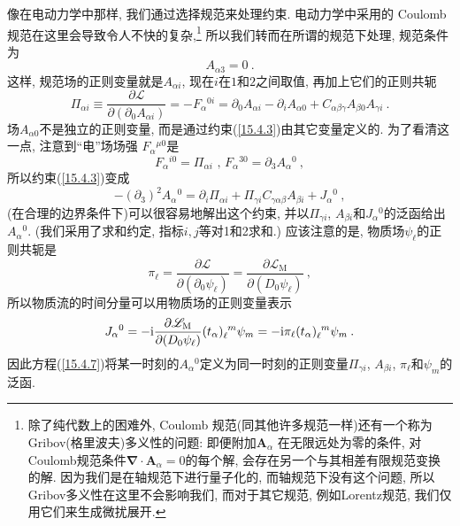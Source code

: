 像在电动力学中那样, 我们通过选择规范来处理约束. 电动力学中采用的 Coulomb 规范在这里会导致令人不快的复杂,\footnote{除了纯代数上的困难外, Coulomb 
规范(同其他许多规范一样)还有一个称为Gribov(格里波夫)多义性的问题:\cite{9} 即便附加$\bm{A}_{\alpha }$%
在无限远处为零的条件, 对Coulomb规范条件$\bm{\nabla}\cdot\bm{A}_{\alpha }=0$的每个解, 会存在另一个与其相差有限规范变换的解. 
因为我们是在轴规范下进行量子化的, 而轴规范下没有这个问题, 所以Gribov多义性在这里不会影响我们, 而对于其它规范, 例如Lorentz规范, 
我们仅用它们来生成微扰展开.} 所以我们转而在所谓的{}规范下处理, 规范条件为
\begin{equation}
A_{\alpha 3}=0\:.   \label{15.4.4}
\end{equation}
这样, 规范场的正则变量就是$A_{\alpha i}$, 现在$i$在$1$和$2$之间取值, 再加上它们的正则共轭\begin{equation}
\Pi _{\alpha i}\equiv \frac{\partial \mathscr{L}}{\partial (\partial
_{0}A_{\alpha i})}=-F_{\alpha }{}^{0i}=\partial _{0}A_{\alpha i}-\partial
_{i}A_{\alpha 0}+C_{\alpha \beta \gamma }A_{\beta 0}A_{\gamma i}\:. 
\label{15.4.5}
\end{equation}%
场$A_{\alpha 0}$不是独立的正则变量, 而是通过约束(\ref{15.4.3})由其它变量定义的. 为了看清这一点, 注意到``电''场场强%
$F_{\alpha }{}^{\mu 0}$是\begin{equation}
F_{\alpha }{}^{i0}=\Pi _{\alpha i}\text{ , \ \ \ \ \ \ \ \ }F_{\alpha
}{}^{30}=\partial _{3}A_{\alpha }{}^{0}\:,   \label{15.4.6}
\end{equation}%
所以约束(\ref{15.4.3})变成\begin{equation}
-(\partial _{3})^{2}A_{\alpha }{}^{0}=\partial _{i}\Pi _{\alpha i}+\Pi
_{\gamma i}C_{\gamma \alpha \beta }A_{\beta i}+J_{\alpha }{}^{0}\:, 
\label{15.4.7}
\end{equation}
(在合理的边界条件下)可以很容易地解出这个约束, 并以$\Pi _{\gamma i}$, $A_{\beta i}$和$J_{\alpha }{}^{0}$的泛函给出$A_{\alpha }{}^{0}$. 
(我们采用了求和约定, 指标$i,j$等对1和2求和.) 应该注意的是, 物质场$\psi _{\ell }$的正则共轭是%
\begin{equation}
\pi _{\ell }=\frac{\partial \mathscr{L}}{\partial (\partial _{0}\psi _{\ell
})}=\frac{\partial \mathscr{L}_{\mathrm{M}}}{\partial (D_{0}\psi _{\ell })}\:, 
\label{15.4.8}
\end{equation}%
所以物质流的时间分量可以{}用物质场的正则变量表示\begin{equation}
J_{\alpha }{}^{0}=-\mathrm{i}\frac{\partial \mathscr{L}_{\mathrm{M}}}{\partial (D_{0}\psi
_{\ell })}(t_{\alpha })_{\ell}^{\phantom{\ell}m}\psi _{m}=-\mathrm{i} \pi _{\ell
}(t_{\alpha })_{\ell}^{\phantom{\ell}m}\psi _{m}\:.   \label{15.4.9}
\end{equation}%
因此方程(\ref{15.4.7})将某一时刻的$A_{\alpha }{}^{0}$定义为同一时刻的正则变量$\Pi
_{\gamma i}$, $A_{\beta i}$, $\pi _{\ell }$和$\psi _{m}$的泛函.

